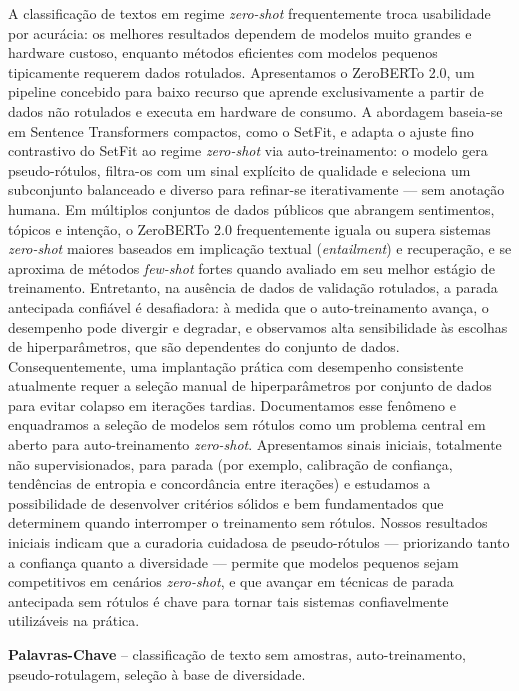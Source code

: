 \documentclass[]{politex-xico}
\begin{document}
\begin{resumo}
A classificação de textos em regime \textit{zero-shot} frequentemente troca usabilidade por acurácia: os melhores resultados dependem de modelos muito grandes e hardware custoso, enquanto métodos eficientes com modelos pequenos tipicamente requerem dados rotulados. Apresentamos o ZeroBERTo 2.0, um pipeline concebido para baixo recurso que aprende exclusivamente a partir de dados não rotulados e executa em hardware de consumo. A abordagem baseia-se em Sentence Transformers compactos, como o SetFit, e adapta o ajuste fino contrastivo do SetFit ao regime \textit{zero-shot} via auto-treinamento: o modelo gera pseudo-rótulos, filtra-os com um sinal explícito de qualidade e seleciona um subconjunto balanceado e diverso para refinar-se iterativamente — sem anotação humana. Em múltiplos conjuntos de dados públicos que abrangem sentimentos, tópicos e intenção, o ZeroBERTo 2.0 frequentemente iguala ou supera sistemas \textit{zero-shot} maiores baseados em implicação textual (\textit{entailment}) e recuperação, e se aproxima de métodos \textit{few-shot} fortes quando avaliado em seu melhor estágio de treinamento.
Entretanto, na ausência de dados de validação rotulados, a parada antecipada confiável é desafiadora: à medida que o auto-treinamento avança, o desempenho pode divergir e degradar, e observamos alta sensibilidade às escolhas de hiperparâmetros, que são dependentes do conjunto de dados. Consequentemente, uma implantação prática com desempenho consistente atualmente requer a seleção manual de hiperparâmetros por conjunto de dados para evitar colapso em iterações tardias. Documentamos esse fenômeno e enquadramos a seleção de modelos sem rótulos como um problema central em aberto para auto-treinamento \textit{zero-shot}. Apresentamos sinais iniciais, totalmente não supervisionados, para parada (por exemplo, calibração de confiança, tendências de entropia e concordância entre iterações) e estudamos a possibilidade de desenvolver critérios sólidos e bem fundamentados que determinem quando interromper o treinamento sem rótulos. Nossos resultados iniciais indicam que a curadoria cuidadosa de pseudo-rótulos — priorizando tanto a confiança quanto a diversidade — permite que modelos pequenos sejam competitivos em cenários \textit{zero-shot}, e que avançar em técnicas de parada antecipada sem rótulos é chave para tornar tais sistemas confiavelmente utilizáveis na prática.

%
\textbf{Palavras-Chave} -- classificação de texto sem amostras, auto-treinamento, pseudo-rotulagem, seleção à base de diversidade.
\end{resumo}
\end{document}
